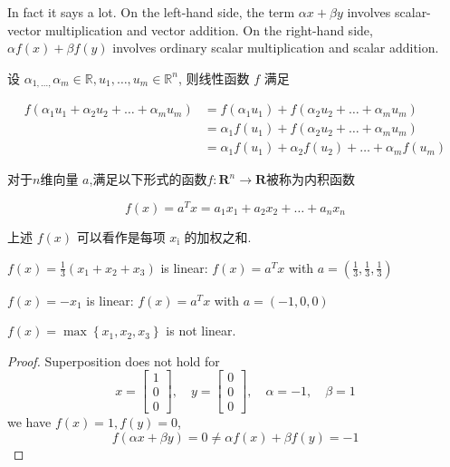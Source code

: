 In fact it says a lot. On the left-hand side, the term $ \alpha x+\beta y $ involves scalar-vector multiplication and vector addition. On the right-hand side, $ \alpha f(x)+\beta f(y) $ involves ordinary scalar multiplication and scalar addition.

\begin{corollary}
    设 $ \alpha_{1, \ldots,} \alpha_{m} \in \mathbb{R}, u_{1}, \ldots, u_{m} \in \mathbb{R}^{n} $, 则线性函数 $ f $ 满足

    $$ \begin{aligned} f\left(\alpha_{1} u_{1}+\alpha_{2} u_{2}+\ldots+\alpha_{m} u_{m}\right) &=f\left(\alpha_{1} u_{1}\right)+f\left(\alpha_{2} u_{2}+\ldots+\alpha_{m} u_{m}\right) \\ &=\alpha_{1} f\left(u_{1}\right)+f\left(\alpha_{2} u_{2}+\ldots+\alpha_{m} u_{m}\right) \\ &=\alpha_{1} f\left(u_{1}\right)+\alpha_{2} f\left(u_{2}\right)+\ldots+\alpha_{m} f\left(u_{m}\right) \end{aligned} $$
\end{corollary}

\begin{definition}
    对于$n$维向量 $ a $,满足以下形式的函数$ f: \mathbf{R}^{n} \rightarrow \mathbf{R} $被称为内积函数

    $$ f(x)=a^{T} x=a_{1} x_{1}+a_{2} x_{2}+\ldots+a_{n} x_{n} $$
\end{definition}

上述 $ f(x) $ 可以看作是每项 $ x_{\mathrm{i}} $ 的加权之和. 

\begin{example}
    $ f(x)=\frac{1}{3}\left(x_{1}+x_{2}+x_{3}\right) $ is linear: $ f(x)=a^{T} x $ with $ a=\left(\frac{1}{3}, \frac{1}{3}, \frac{1}{3}\right) $
\end{example}

\begin{example}
    $ f(x)=-x_{1} $ is linear: $ f(x)=a^{T} x $ with $ a=(-1,0,0) $
\end{example}

\begin{example}
    $ f(x)=\max \left\{x_{1}, x_{2}, x_{3}\right\} $ is not linear.
\end{example}

\begin{proof}
    Superposition does not hold for
$$
x=\left[\begin{array}{l}
1 \\
0 \\
0
\end{array}\right], \quad y=\left[\begin{array}{l}
0 \\
0 \\
0
\end{array}\right], \quad \alpha=-1, \quad \beta=1
$$
we have $ f(x)=1, f(y)=0 $,
$$
f(\alpha x+\beta y)=0 \neq \alpha f(x)+\beta f(y)=-1
$$
\end{proof}

